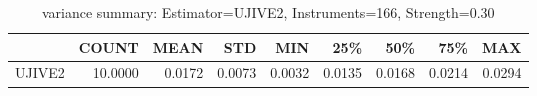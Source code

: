 \begin{table}[ht]
\centering
\caption{variance summary: Estimator=UJIVE2, Instruments=166, Strength=0.30}
\begin{tabular}{lrrrrrrrr}
\toprule
 & COUNT & MEAN & STD & MIN & 25\% & 50\% & 75\% & MAX \\
\midrule
UJIVE2 & 10.0000 & 0.0172 & 0.0073 & 0.0032 & 0.0135 & 0.0168 & 0.0214 & 0.0294 \\
\bottomrule
\end{tabular}
\end{table}
